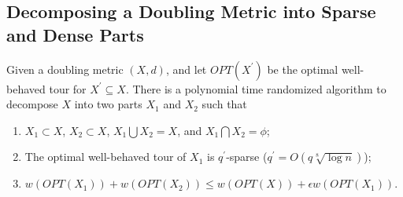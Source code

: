 \documentclass{llncs}
\begin{document}
\subsection{Decomposing a Doubling Metric into Sparse and Dense Parts}
\begin{lemma} 
Given a doubling metric $(X,d)$, and let $OPT(X^\prime)$ be the optimal well-behaved tour for $X^\prime\subseteq X$.
There is a polynomial time randomized algorithm to decompose $X$ into two parts $X_1$ and $X_2$ such that
\begin{enumerate}
\item $X_1\subset X$, $X_2\subset X$, $X_1\bigcup X_2=X$, and $X_1\bigcap X_2=\phi$;
\item The optimal well-behaved tour of $X_1$ is $q^\prime$-sparse ($q^\prime=O(q\sqrt[8]{\log n})$);
\item $w(OPT(X_1))+w(OPT(X_2))\leq w(OPT(X))+\epsilon w(OPT(X_1))$. 
\end{enumerate}
\end{lemma}
\end{document}
